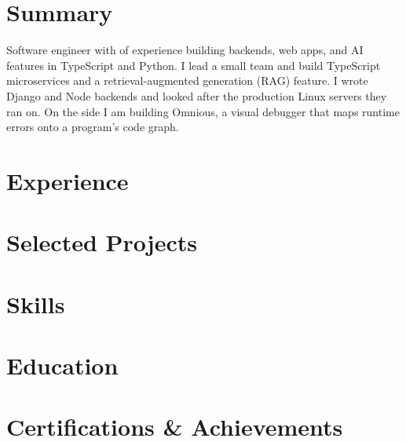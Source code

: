 \documentclass[10pt, a4paper]{article}
\begin{document}
\color{primary}
\cvheader

\section{Summary}
Software engineer with \factExpYears{} of experience building backends, web apps, and AI features in TypeScript and Python. I lead a small team and build TypeScript microservices and a retrieval-augmented generation (RAG) feature. I wrote Django and Node backends and looked after the production Linux servers they ran on. On the side I am building Omnious, a visual debugger that maps runtime errors onto a program's code graph.

\section{Experience}




\section{Selected Projects}



\section{Skills}


\section{Education}
\def\eduthesisline{}


\section{Certifications \& Achievements}
\def\certindustry{}

\end{document}

